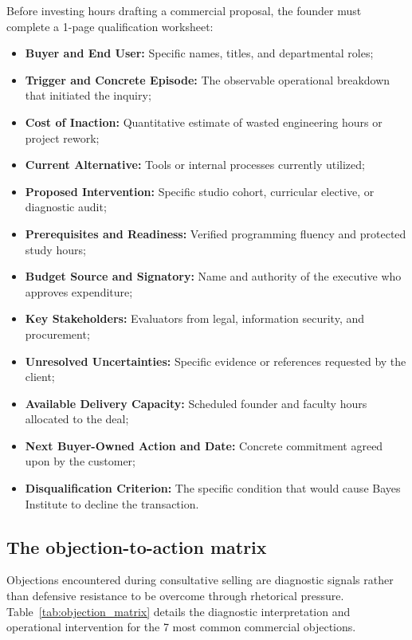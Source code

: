Before investing hours drafting a commercial proposal, the founder must complete a 1-page qualification worksheet:
\begin{itemize}
\item \textbf{Buyer and End User:} Specific names, titles, and departmental roles;
\item \textbf{Trigger and Concrete Episode:} The observable operational breakdown that initiated the inquiry;
\item \textbf{Cost of Inaction:} Quantitative estimate of wasted engineering hours or project rework;
\item \textbf{Current Alternative:} Tools or internal processes currently utilized;
\item \textbf{Proposed Intervention:} Specific studio cohort, curricular elective, or diagnostic audit;
\item \textbf{Prerequisites and Readiness:} Verified programming fluency and protected study hours;
\item \textbf{Budget Source and Signatory:} Name and authority of the executive who approves expenditure;
\item \textbf{Key Stakeholders:} Evaluators from legal, information security, and procurement;
\item \textbf{Unresolved Uncertainties:} Specific evidence or references requested by the client;
\item \textbf{Available Delivery Capacity:} Scheduled founder and faculty hours allocated to the deal;
\item \textbf{Next Buyer-Owned Action and Date:} Concrete commitment agreed upon by the customer;
\item \textbf{Disqualification Criterion:} The specific condition that would cause Bayes Institute to decline the transaction.
\end{itemize}

\subsection{The objection-to-action matrix}

Objections encountered during consultative selling are diagnostic signals rather than defensive resistance to be overcome through rhetorical pressure. Table~\ref{tab:objection_matrix} details the diagnostic interpretation and operational intervention for the 7 most common commercial objections.

